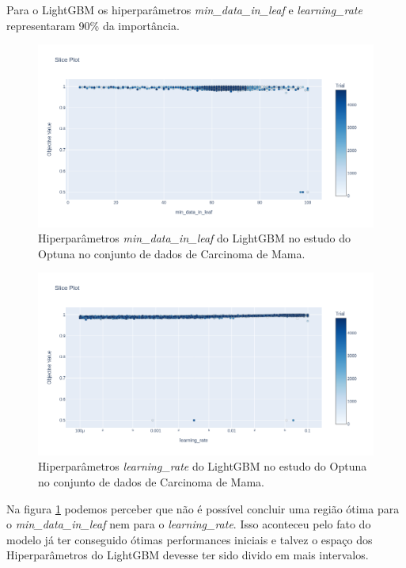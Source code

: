 Para o LightGBM os hiperparâmetros \textit{min\_data\_in\_leaf} e \textit{learning\_rate}  representaram 90\% da importância.
\begin{figure}[H]
 \caption{Hiperparâmetros \textit{min\_data\_in\_leaf} do LightGBM no estudo do Optuna no conjunto de dados de Carcinoma de Mama.}
 \label{fig:op:cancer:min:lgbm}
 \centering
 \includegraphics[scale=0.3]{images/optuna_lgbm_min_cancer.png}
\end{figure}
\begin{figure}[H]
 \caption{Hiperparâmetros \textit{learning\_rate} do LightGBM no estudo do Optuna no conjunto de dados de Carcinoma de Mama.}
 \label{fig:op:cancer:learn:lgbm}
 \centering
 \includegraphics[scale=0.3]{images/optuna_lgbm_learning_cancer.png}
\end{figure}
Na figura \ref{fig:op:cancer:min:lgbm} podemos perceber que não é possível concluir uma região ótima para o \textit{min\_data\_in\_leaf} nem para o \textit{learning\_rate}. Isso aconteceu pelo fato do modelo já ter conseguido ótimas performances iniciais e talvez o espaço dos Hiperparâmetros do LightGBM devesse ter sido divido em mais intervalos.